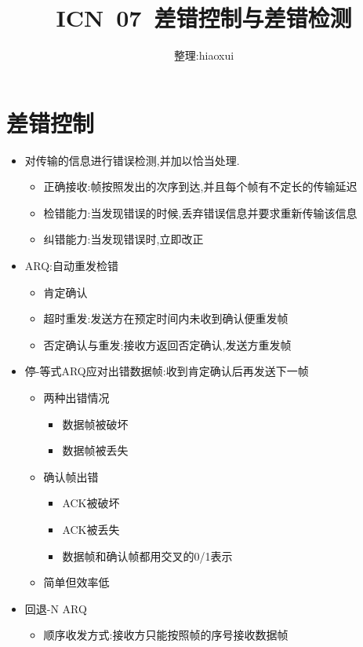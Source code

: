 \documentclass[a4paper,12pt,notitlepage]{article}
\begin{document}
\title{ICN\ 07\ 差错控制与差错检测}
\author{整理:hiaoxui}
\maketitle

\section{差错控制}

\begin{itemize}
	\item 对传输的信息进行错误检测,并加以恰当处理.
	\begin{itemize}
		\item 正确接收:帧按照发出的次序到达,并且每个帧有不定长的传输延迟
		\item 检错能力:当发现错误的时候,丢弃错误信息并要求重新传输该信息
		\item 纠错能力:当发现错误时,立即改正
	\end{itemize}
	\item ARQ:自动重发检错
	\begin{itemize}
		\item 肯定确认
		\item 超时重发:发送方在预定时间内未收到确认便重发帧
		\item 否定确认与重发:接收方返回否定确认,发送方重发帧
	\end{itemize}
	\item 停-等式ARQ应对出错数据帧:收到肯定确认后再发送下一帧
	\begin{itemize}
		\item 两种出错情况
		\begin{itemize}
			\item 数据帧被破坏
			\item 数据帧被丢失
		\end{itemize}
		\item 确认帧出错
		\begin{itemize}
			\item ACK被破坏
			\item ACK被丢失
			\item 数据帧和确认帧都用交叉的0/1表示
		\end{itemize}
		\item 简单但效率低
	\end{itemize}
	\item 回退-N ARQ
	\begin{itemize}
		\item 顺序收发方式:接收方只能按照帧的序号接收数据帧

\end{itemize}
\end{itemize}
\end{document}
